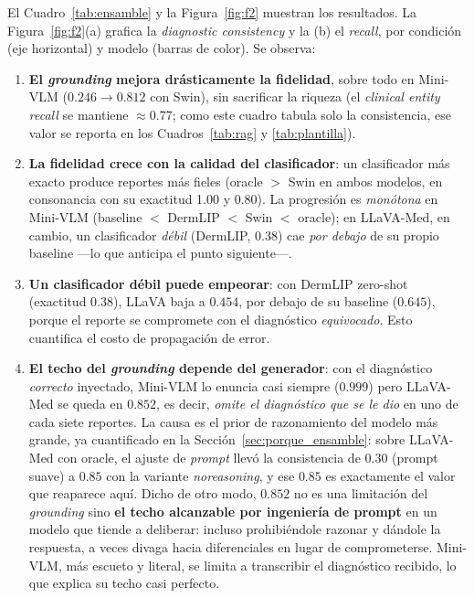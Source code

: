 \documentclass[11pt, a4paper]{article}
\begin{document}
El Cuadro~\ref{tab:ensamble} y la Figura~\ref{fig:f2} muestran los resultados. La
Figura~\ref{fig:f2}(a) grafica la \emph{diagnostic consistency} y la (b) el \emph{recall}, por condición
(eje horizontal) y modelo (barras de color). Se observa:
\begin{enumerate}[leftmargin=1.6em]
  \item \textbf{El \emph{grounding} mejora drásticamente la fidelidad}, sobre todo en Mini-VLM
  ($0.246 \rightarrow 0.812$ con Swin), sin sacrificar la riqueza (el \emph{clinical entity recall} se
  mantiene $\approx 0.77$; como este cuadro tabula solo la consistencia, ese valor se reporta en los
  Cuadros~\ref{tab:rag} y \ref{tab:plantilla}).
  \item \textbf{La fidelidad crece con la calidad del clasificador}: un clasificador más exacto produce
  reportes más fieles (oracle $>$ Swin en ambos modelos, en consonancia con su exactitud 1.00 y 0.80). La
  progresión es \emph{monótona} en Mini-VLM (baseline $<$ DermLIP $<$ Swin $<$ oracle); en LLaVA-Med, en
  cambio, un clasificador \emph{débil} (DermLIP, 0.38) cae \emph{por debajo} de su propio baseline —lo que
  anticipa el punto siguiente—.
  \item \textbf{Un clasificador débil puede empeorar}: con DermLIP zero-shot (exactitud 0.38), LLaVA
  baja a $0.454$, por debajo de su baseline ($0.645$), porque el reporte se compromete con el
  diagnóstico \emph{equivocado}. Esto cuantifica el costo de propagación de error.
  \item \textbf{El techo del \emph{grounding} depende del generador}: con el diagnóstico \emph{correcto}
  inyectado, Mini-VLM lo enuncia casi siempre ($0.999$) pero LLaVA-Med se queda en $0.852$, es decir,
  \emph{omite el diagnóstico que se le dio} en uno de cada siete reportes. La causa es el prior de
  razonamiento del modelo más grande, ya cuantificado en la Sección~\ref{sec:porque_ensamble}: sobre
  LLaVA-Med con oracle, el ajuste de \emph{prompt} llevó la consistencia de $0.30$ (prompt suave) a $0.85$
  con la variante \emph{noreasoning}, y ese $0.85$ es exactamente el valor que reaparece aquí. Dicho de
  otro modo, $0.852$ no es una limitación del \emph{grounding} sino \textbf{el techo alcanzable por
  ingeniería de prompt} en un modelo que tiende a deliberar: incluso prohibiéndole razonar y dándole la
  respuesta, a veces divaga hacia diferenciales en lugar de comprometerse. Mini-VLM, más escueto y literal,
  se limita a transcribir el diagnóstico recibido, lo que explica su techo casi perfecto.
\end{enumerate}
\end{document}
